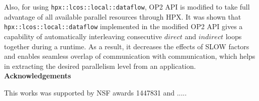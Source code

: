 \documentclass[conference]{IEEEtran}
\begin{document}
Also, for using \texttt{hpx::lcos::local::dataflow}, OP2 API is modified to take full advantage of all available parallel resources through HPX. It was shown that \texttt{hpx::lcos::local::dataflow} implemented in the modified OP2 API gives a capability of automatically interleaving consecutive $direct$ and $indirect$ loops together during a runtime. As a result, it decreases the effects of SLOW factors and enables seamless overlap of communication with communication, which helps in extracting the desired parallelism level from an application. \\

\noindent
\textbf{Acknowledgements}

 This works was supported by NSF awards 1447831 and .....\\



 




\end{document}
